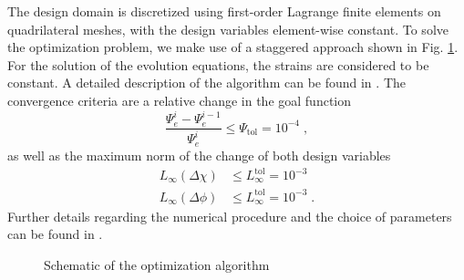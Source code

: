 \documentclass[
	pdflatex,
	sn-mathphys-num
]{sn-jnl}
\theoremstyle{thmstyleone}%
\theoremstyle{thmstyletwo}%
\theoremstyle{thmstylethree}%
\begin{document}
The design domain is discretized using first-order Lagrange finite elements on quadrilateral meshes, with the design variables element-wise constant.
To solve the optimization problem, we make use of a staggered approach shown in Fig. \ref{fig:to_schema}. For the solution of the evolution equations, the strains are considered to be constant. A detailed description of the algorithm can be found in \cite{jantos_accurate_2019}. The convergence criteria are a relative change in the goal function
\begin{equation}
    \frac{\Psi_e^{i}-\Psi_e^{i-1}}{\Psi_e^{i}}\leq\Psi_\mathrm{tol}=10^{-4}\;,
\end{equation}
as well as the maximum norm of the change of both design variables
\begin{align}
    L_\infty(\Delta\chi)&\leq L_\infty^\mathrm{tol}=10^{-3}\\
    L_\infty(\Delta\phi)&\leq L_\infty^\mathrm{tol}=10^{-3}\; .
\end{align}
Further details regarding the numerical procedure and the choice of parameters can be found in \cite{pravda_macroscopic_2026}.
\begin{figure}
    \centering
    \caption{Schematic of the optimization algorithm}
    \label{fig:to_schema}
\end{figure}
\end{document}

